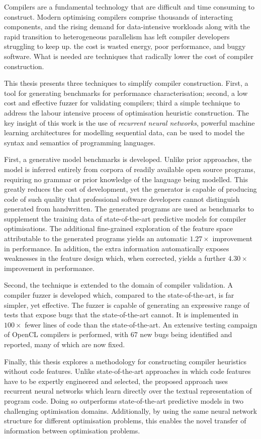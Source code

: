 Compilers are a fundamental technology that are difficult and time consuming to construct. Modern optimising compilers comprise thousands of interacting components, and the rising demand for data-intensive workloads along with the rapid transition to heterogeneous parallelism has left compiler developers struggling to keep up. the cost is wasted energy, poor performance, and buggy software. What is needed are techniques that radically lower the cost of compiler construction.

This thesis presents three techniques to simplify compiler construction. First, a tool for generating benchmarks for performance characterisation; second, a low cost and effective fuzzer for validating compilers; third a simple technique to address the labour intensive process of optimisation heuristic construction. The key insight of this work is the use of \emph{recurrent neural networks}, powerful machine learning architectures for modelling sequential data, can be used to model the syntax and semantics of programming languages.

First, a generative model benchmarks is developed. Unlike prior approaches, the model is inferred entirely from corpora of readily available open source programs, requiring no grammar or prior knowledge of the language being modelled. This greatly reduces the cost of development, yet the generator is capable of producing code of such quality that professional software developers cannot distinguish generated from handwritten. The generated programs are used as benchmarks to supplement the training data of state-of-the-art predictive models for compiler optimisations. The additional fine-grained exploration of the feature space attributable to the generated programs yields an automatic $1.27\times$ improvement in performance. In addition, the extra information automatically exposes weaknesses in the feature design which, when corrected, yields a further $4.30\times$ improvement in performance.

Second, the technique is extended to the domain of compiler validation. A compiler fuzzer is developed which, compared to the state-of-the-art, is far simpler, yet effective. The fuzzer is capable of generating an expressive range of tests that expose bugs that the state-of-the-art cannot. It is implemented in $100\times$ fewer lines of code than the state-of-the-art. An extensive testing campaign of OpenCL compilers is performed, with 67 new bugs being identified and reported, many of which are now fixed.

Finally, this thesis explores a methodology for constructing compiler heuristics without code features. Unlike state-of-the-art approaches in which code features have to be expertly engineered and selected, the proposed approach uses recurrent neural networks which learn directly over the textual representation of program code. Doing so outperforms state-of-the-art predictive models in two challenging optimisation domains. Additionally, by using the same neural network structure for different optimisation problems, this enables the novel transfer of information between optimisation problems.
